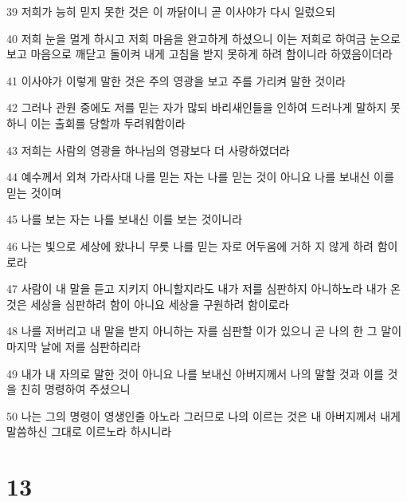 \par 39 저희가 능히 믿지 못한 것은 이 까닭이니 곧 이사야가 다시 일렀으되
\par 40 저희 눈을 멀게 하시고 저희 마음을 완고하게 하셨으니 이는 저희로 하여금 눈으로 보고 마음으로 깨닫고 돌이켜 내게 고침을 받지 못하게 하려 함이니라 하였음이더라
\par 41 이사야가 이렇게 말한 것은 주의 영광을 보고 주를 가리켜 말한 것이라
\par 42 그러나 관원 중에도 저를 믿는 자가 많되 바리새인들을 인하여 드러나게 말하지 못하니 이는 출회를 당할까 두려워함이라
\par 43 저희는 사람의 영광을 하나님의 영광보다 더 사랑하였더라
\par 44 예수께서 외쳐 가라사대 나를 믿는 자는 나를 믿는 것이 아니요 나를 보내신 이를 믿는 것이며
\par 45 나를 보는 자는 나를 보내신 이를 보는 것이니라
\par 46 나는 빛으로 세상에 왔나니 무릇 나를 믿는 자로 어두움에 거하 지 않게 하려 함이로라
\par 47 사람이 내 말을 듣고 지키지 아니할지라도 내가 저를 심판하지 아니하노라 내가 온 것은 세상을 심판하려 함이 아니요 세상을 구원하려 함이로라
\par 48 나를 저버리고 내 말을 받지 아니하는 자를 심판할 이가 있으니 곧 나의 한 그 말이 마지막 날에 저를 심판하리라
\par 49 내가 내 자의로 말한 것이 아니요 나를 보내신 아버지께서 나의 말할 것과 이를 것을 친히 명령하여 주셨으니
\par 50 나는 그의 명령이 영생인줄 아노라 그러므로 나의 이르는 것은 내 아버지께서 내게 말씀하신 그대로 이르노라 하시니라

\chapter{13}

